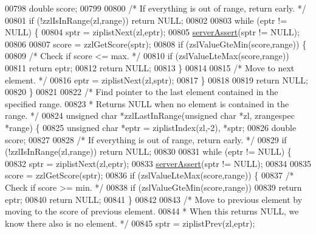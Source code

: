 \begin{DoxyCode}
00798     \textcolor{keywordtype}{double} score;
00799 
00800     \textcolor{comment}{/* If everything is out of range, return early. */}
00801     \textcolor{keywordflow}{if} (!zzlIsInRange(zl,range)) \textcolor{keywordflow}{return} NULL;
00802 
00803     \textcolor{keywordflow}{while} (eptr != NULL) \{
00804         sptr = ziplistNext(zl,eptr);
00805         \hyperlink{server_8h_a88114b5169b4c382df6b56506285e56a}{serverAssert}(sptr != NULL);
00806 
00807         score = zzlGetScore(sptr);
00808         \textcolor{keywordflow}{if} (zslValueGteMin(score,range)) \{
00809             \textcolor{comment}{/* Check if score <= max. */}
00810             \textcolor{keywordflow}{if} (zslValueLteMax(score,range))
00811                 \textcolor{keywordflow}{return} eptr;
00812             \textcolor{keywordflow}{return} NULL;
00813         \}
00814 
00815         \textcolor{comment}{/* Move to next element. */}
00816         eptr = ziplistNext(zl,sptr);
00817     \}
00818 
00819     \textcolor{keywordflow}{return} NULL;
00820 \}
00821 
00822 \textcolor{comment}{/* Find pointer to the last element contained in the specified range.}
00823 \textcolor{comment}{ * Returns NULL when no element is contained in the range. */}
00824 \textcolor{keywordtype}{unsigned} \textcolor{keywordtype}{char} *zzlLastInRange(\textcolor{keywordtype}{unsigned} \textcolor{keywordtype}{char} *zl, zrangespec *range) \{
00825     \textcolor{keywordtype}{unsigned} \textcolor{keywordtype}{char} *eptr = ziplistIndex(zl,-2), *sptr;
00826     \textcolor{keywordtype}{double} score;
00827 
00828     \textcolor{comment}{/* If everything is out of range, return early. */}
00829     \textcolor{keywordflow}{if} (!zzlIsInRange(zl,range)) \textcolor{keywordflow}{return} NULL;
00830 
00831     \textcolor{keywordflow}{while} (eptr != NULL) \{
00832         sptr = ziplistNext(zl,eptr);
00833         \hyperlink{server_8h_a88114b5169b4c382df6b56506285e56a}{serverAssert}(sptr != NULL);
00834 
00835         score = zzlGetScore(sptr);
00836         \textcolor{keywordflow}{if} (zslValueLteMax(score,range)) \{
00837             \textcolor{comment}{/* Check if score >= min. */}
00838             \textcolor{keywordflow}{if} (zslValueGteMin(score,range))
00839                 \textcolor{keywordflow}{return} eptr;
00840             \textcolor{keywordflow}{return} NULL;
00841         \}
00842 
00843         \textcolor{comment}{/* Move to previous element by moving to the score of previous element.}
00844 \textcolor{comment}{         * When this returns NULL, we know there also is no element. */}
00845         sptr = ziplistPrev(zl,eptr);

\end{DoxyCode}
